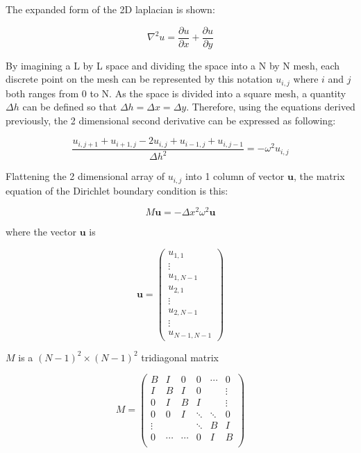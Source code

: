 The expanded form of the 2D laplacian is shown:

\begin{equation}
    \nabla^2 u = \frac{\partial u}{\partial x} + \frac{\partial u}{\partial y}
\end{equation}

By imagining a L by L space and dividing the space into a N by N mesh, each discrete point on the mesh can be represented by this notation $u_{i,j}$ where $i$ and $j$ both ranges from 0 to N. As the space is divided into a square mesh, a quantity $\Delta h$ can be defined so that $\Delta h = \Delta x = \Delta y$. Therefore, using the equations derived previously, the 2 dimensional second derivative can be expressed as following:

\begin{equation}
    \frac{u_{i,j+1}+u_{i+1,j}-2u_{i,j}+u_{i-1,j}+u_{i,j-1}}{\Delta h^2} = -\omega^2 u_{i,j}
\end{equation}

Flattening the 2 dimensional array of $u_{i,j}$ into 1 column of vector $\mathbf{u}$, the matrix equation of the Dirichlet boundary condition is this:

\begin{equation}
    M \mathbf{u} = -\Delta x^2\omega^2 \mathbf{u}
\end{equation}

where the vector $\mathbf{u}$ is 

\begin{equation}
    \mathbf{u} = 
\begin{pmatrix}
    u_{1,1}\\
    \vdots\\
    u_{1,N-1}\\
    u_{2,1}\\
    \vdots\\
    u_{2,N-1}\\
    \vdots\\
    u_{N-1,N-1}
\end{pmatrix}
\end{equation}

$M$ is a $(N-1)^2 \times (N-1)^2$ tridiagonal matrix

\begin{equation}
    M =
\begin{pmatrix}
    B     &     I&     0&     0&\cdots&      0\\
    I     &     B&     I&     0&      & \vdots\\
    0     &     I&     B&     I&      & \vdots\\
    0     &     0&     I&\ddots&\ddots&      0\\
    \vdots&      &      &\ddots&     B&      I\\
    0     &\cdots&\cdots&     0&     I&      B\\
\end{pmatrix}
\end{equation}

